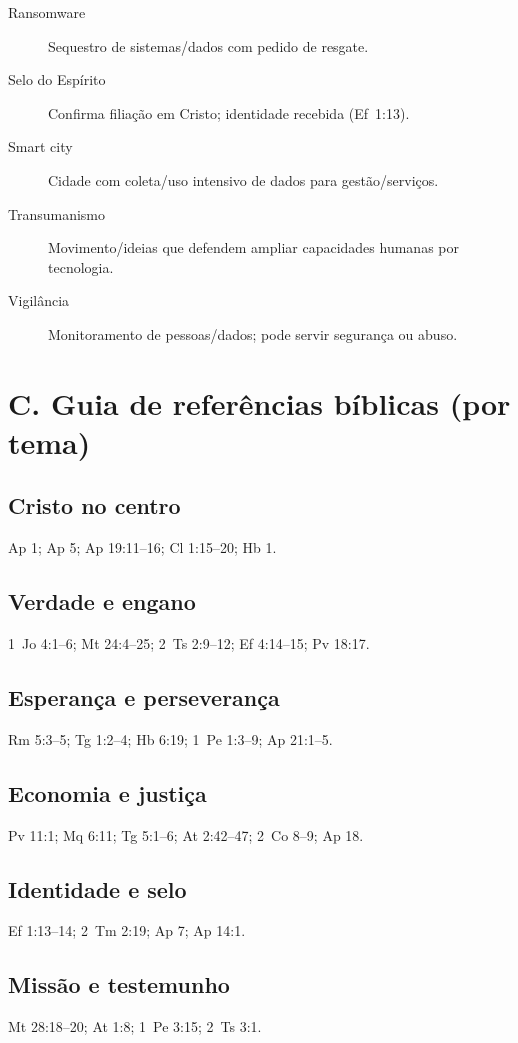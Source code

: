 \begin{description}
  \item[Ransomware] Sequestro de sistemas/dados com pedido de resgate.
  \item[Selo do Espírito] Confirma filiação em Cristo; identidade recebida (Ef~1:13).
  \item[Smart city] Cidade com coleta/uso intensivo de dados para gestão/serviços.
  \item[Transumanismo] Movimento/ideias que defendem ampliar capacidades humanas por tecnologia.
  \item[Vigilância] Monitoramento de pessoas/dados; pode servir segurança ou abuso.
\end{description}

\bigskip
\section*{C. Guia de referências bíblicas (por tema)}
\subsection*{Cristo no centro}
Ap 1; Ap 5; Ap 19:11--16; Cl 1:15--20; Hb 1.

\subsection*{Verdade e engano}
1~Jo 4:1--6; Mt 24:4--25; 2~Ts 2:9--12; Ef 4:14--15; Pv 18:17.

\subsection*{Esperança e perseverança}
Rm 5:3--5; Tg 1:2--4; Hb 6:19; 1~Pe 1:3--9; Ap 21:1--5.

\subsection*{Economia e justiça}
Pv 11:1; Mq 6:11; Tg 5:1--6; At 2:42--47; 2~Co 8--9; Ap 18.

\subsection*{Identidade e selo}
Ef 1:13--14; 2~Tm 2:19; Ap 7; Ap 14:1.

\subsection*{Missão e testemunho}
Mt 28:18--20; At 1:8; 1~Pe 3:15; 2~Ts 3:1.

